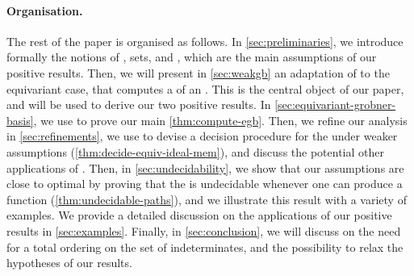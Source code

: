 \paragraph{Organisation.} \AP The rest of the paper is organised as follows. In
\cref{sec:preliminaries}, we introduce formally the
notions of ,  sets, and
, which are the main assumptions of our positive
results. Then, we will present in \cref{sec:weakgb}
an adaptation of  to the equivariant case, that computes a  of an . This is the central object of our
paper, and will be used to derive our two positive results. In
\cref{sec:equivariant-grobner-basis},
we use  to prove our main
\cref{thm:compute-egb}.
Then, we refine our analysis in
\cref{sec:refinements},
we use  to devise a decision procedure for
the  under weaker assumptions
(\cref{thm:decide-equiv-ideal-mem}),
and discuss the potential other applications of . Then, in
\cref{sec:undecidability}, we show that
our assumptions are close to optimal by proving that the  is undecidable whenever one can produce a  function (\cref{thm:undecidable-paths}), and we
illustrate this result with a variety of examples. We provide a detailed
discussion on the applications of our positive results in \cref{sec:examples}.
Finally, in \cref{sec:conclusion}, we will
discuss on the need for a total ordering on the set of indeterminates, and the
possibility to relax the hypotheses of our results.

